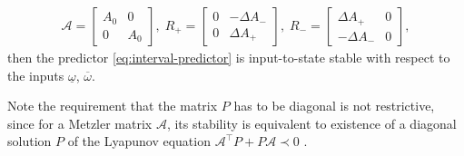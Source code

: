 \begin{theorem}
\begin{leftbar}[theorembar]
{\begin{gather*}
		\mathcal{A}=\left[\begin{array}{cc}
		A_{0} & 0\\
		0 & A_{0}
		\end{array}\right],\;R_{+}=\left[\begin{array}{cc}
		0 & -\Delta A_{-}\\
		0 & \Delta A_{+}
		\end{array}\right],\;R_{-}=\left[\begin{array}{cc}
		\Delta A_{+} & 0\\
		-\Delta A_{-} & 0
		\end{array}\right],
		\end{gather*}
	}then the predictor \eqref{eq:interval-predictor} is input-to-state stable with respect to the inputs $\underline{\omega}$, $\overline{\omega}$.
\end{leftbar}
\end{theorem}
Note the requirement that the matrix $P$ has to be diagonal is not restrictive, since for a Metzler matrix $\mathcal{A}$, its stability is equivalent to existence of a diagonal solution $P$ of the Lyapunov equation $\mathcal{A}^{\top}P+P\mathcal{A}\prec0$ \citep{FarinaRinaldi2000}.
